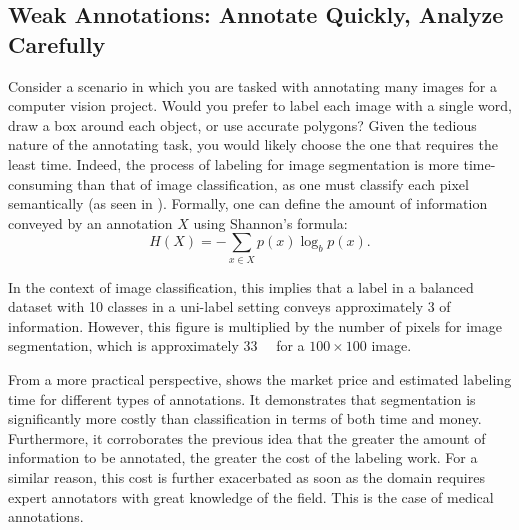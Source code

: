 \subsection{Weak Annotations: Annotate Quickly, Analyze Carefully}
Consider a scenario in which you are tasked with annotating many images for a computer vision project. Would you prefer to label each image with a single word, draw a box around each object, or use accurate polygons? Given the tedious nature of the annotating task, you would likely choose the one that requires the least time. Indeed, the process of labeling for image segmentation is more time-consuming than that of image classification, as one must classify each pixel semantically (as seen in ). Formally, one can define the amount of information conveyed by an annotation $X$ using Shannon's formula:
\begin{equation}
    H(X)=-\sum_{x\in X} p(x)\log_b p(x).
\end{equation}

In the context of image classification, this implies that a label in a balanced dataset with 10 classes in a uni-label setting conveys approximately \qty{3}{\bit} of information. However, this figure is multiplied by the number of pixels for image segmentation, which is approximately \qty{33}{\kilo\bit} for a $100\times 100$ image. 


From a more practical perspective,  shows the market price and estimated labeling time for different types of annotations. It demonstrates that segmentation is significantly more costly than classification in terms of both time and money. Furthermore, it corroborates the previous idea that the greater the amount of information to be annotated, the greater the cost of the labeling work. For a similar reason, this cost is further exacerbated as soon as the domain requires expert annotators with great knowledge of the field. This is the case of medical annotations.

